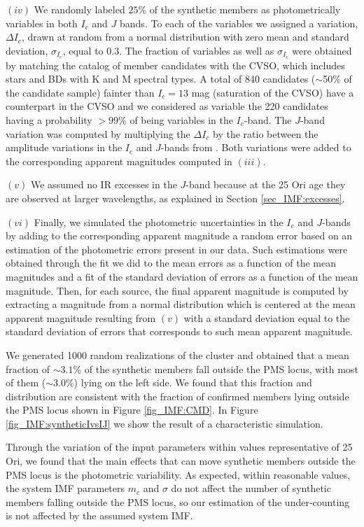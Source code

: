 \documentclass[12pt]{article}
\begin{document}
$(iv)$ We randomly labeled $25$\% of the synthetic members as photometrically variables in both $I_c$ and $J$ bands. To each of the variables we assigned a variation, $\Delta I_c$, drawn at random from a normal distribution with zero mean and standard deviation, $\sigma _{I_c}$, equal to 0.3. The fraction of variables as well as $\sigma _{I_c}$ were obtained by matching the catalog of member candidates with the CVSO, which includes stars and BDs with K and M spectral types. A total of 840 candidates ($\sim$50\% of the candidate sample) fainter than $I_c=13$ mag (saturation of the CVSO) have a counterpart in the CVSO and we considered as variable the 220 candidates having a probability $>99$\% of being variables in the $I_c$-band. The $J$-band variation was computed by multiplying the $\Delta I_c$ by the ratio between the amplitude variations in the $I_c$ and $J$-bands from \cite{Scholz2009}. Both variations were added to the corresponding apparent magnitudes computed in $(iii)$.

$(v)$ We assumed no IR excesses in the $J$-band because at the 25 Ori age they are observed at larger wavelengths, as explained in Section \ref{sec_IMF:excesses}.

$(vi)$ Finally, we simulated the photometric uncertainties in the $I_c$ and $J$-bands by adding to the corresponding apparent magnitude a random error based on an estimation of the photometric errors present in our data. Such estimations were obtained through the fit we did to the mean errors as a function of the mean magnitudes and a fit of the standard deviation of errors as a function of the mean magnitude. Then, for each source, the final apparent magnitude is computed by extracting a magnitude from a normal distribution which is centered at the mean apparent magnitude resulting from $(v)$ with a standard deviation equal to the standard deviation of errors that corresponds to such mean apparent magnitude.

We generated 1000 random realizations of the cluster and obtained that a mean fraction of $\sim3.1$\% of the synthetic members fall outside the PMS locus, with most of them ($\sim3.0$\%) lying on the left side. We found that this fraction and distribution are consistent with the fraction of confirmed members lying outside the PMS locus shown in Figure \ref{fig_IMF:CMD}. In Figure \ref{fig_IMF:syntheticIvsIJ} we show the result of a characteristic simulation.

Through the variation of the input parameters within values representative of 25 Ori, we found that the main effects that can move synthetic members outside the PMS locus is the photometric variability. As expected, within reasonable values, the system IMF parameters $m_c$ and $\sigma$ do not affect the number of synthetic members falling outside the PMS locus, so our estimation of the under-counting is not affected by the assumed system IMF.
\end{document}

